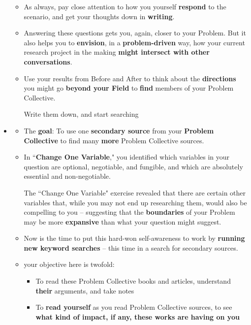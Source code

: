 \documentclass[11pt]{article}
\begin{document}
\begin{itemize}
\begin{exercise}
\begin{itemize}
\item As always, pay close attention to how you yourself \textbf{respond} to the scenario, and get your thoughts down in \textbf{writing}.

\item Answering these questions gets you, again, closer to your Problem.  But it also helps you to \textbf{envision}, in a \textbf{problem-driven} way, how your current research project in the making \textbf{might intersect with other conversations}. 

\item Use your results from Before and After to think about the \textbf{directions} you might go \textbf{beyond your Field} to \textbf{find} members of your Problem Collective.

Write them down, and start searching
\end{itemize}
\end{exercise}

\item  \begin{exercise}
\begin{itemize}
\item The \textbf{goal}: To use one \textbf{secondary source} from your \textbf{Problem Collective} to find many \textbf{more} Problem Collective sources.

\item  In ``\textbf{Change One Variable}," you identified which variables in your question are optional, negotiable, and fungible, and which are absolutely essential and non-negotiable. 

The ``Change One Variable" exercise revealed that there are certain other variables that, while you may not end up researching them, would also be compelling to you -- suggesting that the \textbf{boundaries} of your Problem may be more \textbf{expansive} than what your question might suggest.

\item Now is the time to put this hard-won self-awareness to work by \textbf{running new keyword searches} -- this time in a search for secondary sources. 

\item your objective here is twofold:
\begin{itemize}
\item To read these Problem Collective books and articles, understand \textbf{their} arguments, and take notes
\item To \textbf{read yourself} as you read Problem Collective sources, to see \textbf{what kind of impact, if any, these works are having on you}
\end{itemize}


\end{itemize}
\end{exercise}
\end{itemize}
\end{document}
